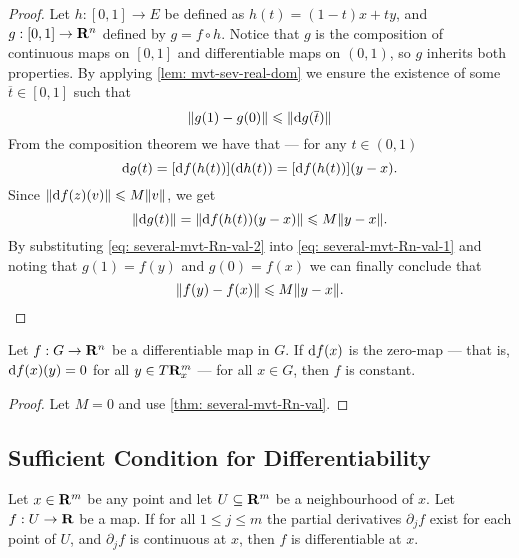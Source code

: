 \begin{proof}
    Let \(h: [0, 1] \to E\) be defined as \(h(t) = (1-t)x + ty\), and \(g: [0, 1]
    \to \mathbf{R}^n\) defined by \(g = f \circ h\). Notice that \(g\) is the composition
    of continuous maps on \([0, 1]\) and differentiable maps on \((0, 1)\), so
    \(g\) inherits both properties. By applying \cref{lem: mvt-sev-real-dom} we
    ensure the existence of some \(\overline t \in [0, 1]\) such that
    \begin{equation}\label{eq: several-mvt-Rn-val-1}
        \lVert g(1) - g(0)\rVert \leqslant \lVert\mathrm{d} g(\overline t)\rVert
    \end{equation}
    From the composition theorem we have that --- for any \(t \in (0, 1)\)
    \[
        \mathrm{d} g(t) = [\mathrm{d} f(h(t))](\mathrm{d} h(t)) = [\mathrm{d} f(h(t))](y - x).
    \]
    Since \(\lVert\mathrm{d} f(z)(v)\rVert \leqslant M \lVert v\rVert\), we get
    \begin{equation}\label{eq: several-mvt-Rn-val-2}
        \lVert\mathrm{d} g(t)\rVert
        = \lVert\mathrm{d} f(h(t))(y - x)\rVert
        \leqslant M \lVert y - x\rVert.
    \end{equation}
    By substituting \cref{eq: several-mvt-Rn-val-2} into \cref{eq:
        several-mvt-Rn-val-1} and noting that \(g(1) = f(y)\) and \(g(0) = f(x)\) we
    can finally conclude that
    \[
        \lVert f(y) - f(x)\rVert \leqslant M \lVert y - x\rVert.
    \]
\end{proof}

\begin{corollary}
    Let \(f: G \to \mathbf{R}^n\) be a differentiable map in \(G\). If \(\mathrm{d} f(x)\) is
    the zero-map --- that is, \(\mathrm{d} f(x)(y) = 0\) for all \(y \in T\mathbf{R}^m_x\) ---
    for all \(x \in G\), then \(f\) is constant.
\end{corollary}

\begin{proof}
    Let \(M = 0\) and use \cref{thm: several-mvt-Rn-val}.
\end{proof}

\subsection{Sufficient Condition for Differentiability}

\begin{theorem}\label{thm: suff-partial-continuous}
    Let \(x \in \mathbf{R}^m\) be any point and let \(U \subseteq \mathbf{R}^m\) be a
    neighbourhood of \(x\). Let \(f: U \to \mathbf{R}\) be a map. If for all \(1 \leq j
    \leq m\) the partial derivatives \(\partial_j f\) exist for each point of
    \(U\), and \(\partial_j f\) is continuous at \(x\), then \(f\) is
    differentiable at \(x\).
\end{theorem}

